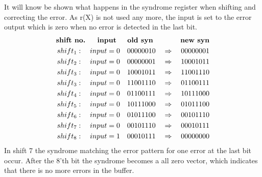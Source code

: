 \documentclass[Main]{subfiles}
\begin{document}
It will know be shown what happens in the syndrome register when shifting and correcting the error.
As r(X) is not used any more, the input is set to the error output which is zero when no error is detected in the last bit.
\begin{eqnarray*}
\textbf{shift no. \quad	input \quad old syn \qquad \quad new syn}\\
shift_1: \quad input = 0 \quad 00000010 \quad \Rightarrow \quad 00000001\\
shift_2: \quad input = 0 \quad 00000001 \quad \Rightarrow \quad 10001011\\
shift_3: \quad input = 0 \quad 10001011 \quad \Rightarrow \quad 11001110\\
shift_3: \quad input = 0 \quad 11001110 \quad \Rightarrow \quad 01100111\\
shift_4: \quad input = 0 \quad 01100111 \quad \Rightarrow \quad 10111000\\
shift_5: \quad input = 0 \quad 10111000 \quad \Rightarrow \quad 01011100\\
shift_6: \quad input = 0 \quad 01011100 \quad \Rightarrow \quad 00101110\\
shift_7: \quad input = 0 \quad 00101110 \quad \Rightarrow \quad 00010111\\
shift_8: \quad input = 1 \quad 00010111 \quad \Rightarrow \quad 00000000\\
\end{eqnarray*}
In shift 7 the syndrome matching the error pattern for one error at the last bit occur.
After the 8'th bit the syndrome becomes a all zero vector, which indicates that there is no more errors in the buffer.
 
\end{document}
